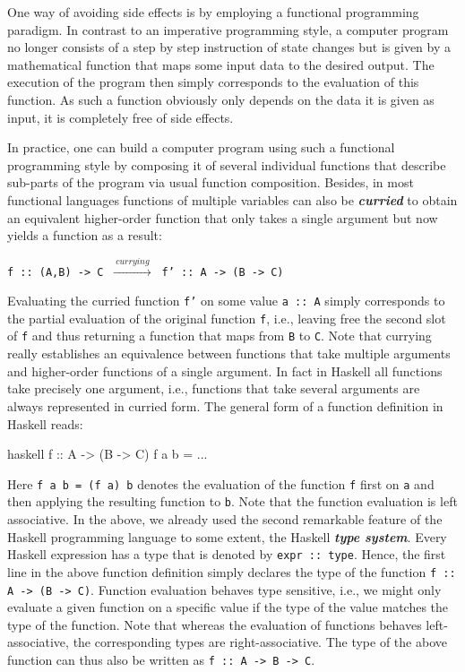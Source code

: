 One way of avoiding side effects is by employing a functional programming paradigm. In contrast to an imperative programming style, a computer program no longer consists of a step by step instruction of state changes but is given by a mathematical function that maps some input data to the desired output. The execution of the program then simply corresponds to the evaluation of this function. As such a function obviously only depends on the data it is given as input, it is completely free of side effects.

In practice, one can build a computer program using such a functional programming style by composing it of several individual functions that describe sub-parts of the program via usual function composition. Besides, in most functional languages functions of multiple variables can also be  \textit{\textbf{curried}} to obtain an equivalent higher-order function that only takes a single argument but now yields a function as a result:
\begin{center}
    \texttt{f :: (A,B) -> C} $\ \xrightarrow{ \ currying \ } \ $
    \texttt{f' :: A -> (B -> C)}
\end{center}
Evaluating the curried function \texttt{f'} on some value \texttt{a :: A} simply corresponds to the partial evaluation of the original function \texttt{f}, i.e., leaving free the second slot of \texttt{f} and thus returning a function that maps from \texttt{B}  to \texttt{C}. Note that currying really establishes an equivalence between functions that take multiple arguments and higher-order functions of a single argument.
In fact in Haskell all functions take precisely one argument, i.e., functions that take several arguments are always represented in curried form. The general form of a function definition in Haskell reads:
\begin{center}
\begin{cminted}{haskell}
f :: A -> (B -> C)
f a b = ...  
\end{cminted}
\end{center}
Here
\texttt{f a b = (f a) b} denotes the evaluation of the function \texttt{f} first on \texttt{a} and then applying the resulting function to \texttt{b}. Note that the function evaluation is left associative.
In the above, we already used the second remarkable feature of the  Haskell programming language to some extent, the Haskell \textbf{\textit{type system}}. Every Haskell expression has a type that is denoted by \texttt{expr :: type}. Hence, the first line in the above function definition simply declares   the type of the function \texttt{f :: A -> (B -> C)}.
Function evaluation behaves type sensitive, i.e., we might only evaluate a given function on a specific value if the type of the value matches the type of the function.
Note that whereas the evaluation of functions behaves left-associative, the corresponding types are right-associative. The type of the above function can thus also be written as \texttt{f :: A -> B -> C}.


